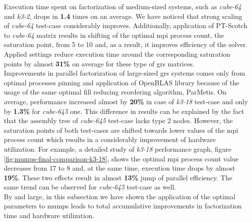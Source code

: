 Execution time spent on factorization of medium-sized systems, such as \textit{cube-64} and \textit{k3-2}, drops in \textbf{1.4} times on an average. We have noticed that strong scaling of \textit{cube-64} test-case considerably improves. Additionally, application of PT-Scotch to \textit{cube-64} matrix results in shifting of the optimal \gls{mpi} process count, the saturation point, from 5 to 10 and, as a result, it improves efficiency of the solver. Applied settings reduce execution time around the corresponding saturation points by almost \textbf{31\%} on average for these type of \gls{grs} matrices.\\



Improvements in parallel factorization of large-sized \gls{grs} systems comes only from optimal processes pinning and application of OpenBLAS library because of the usage of the same optimal fill reducing reordering algorithm, ParMetis. On average, performance increased almost by \textbf{20\%} in case of \textit{k3-18} test-case and only by \textbf{1.3\%} for \textit{cube-645} one. This difference in results can be explained by the fact that the assembly tree of \textit{cube-645} test-case lacks type 2 nodes. However, the saturation points of both test-cases are shifted towards lower values of the \gls{mpi} process count which results in a considerably improvement of hardware utilization. For example, a detailed study of \textit{k3-18} performance graph, figure \ref{fig:mumps-final-comparison-k3-18}, shows the optimal \gls{mpi} process count value decreases from 17 to 8 and, at the same time, execution time drops by almost \textbf{19\%}. These two effects result in almost \textbf{13\%} jump of parallel efficiency. The same trend can be observed for \textit{cube-645} test-case as well.\\


By and large, in this subsection we have shown the application of the optimal parameters to \gls{mumps} leads to total accumulative improvements in factorization time and hardware utilization.\\



